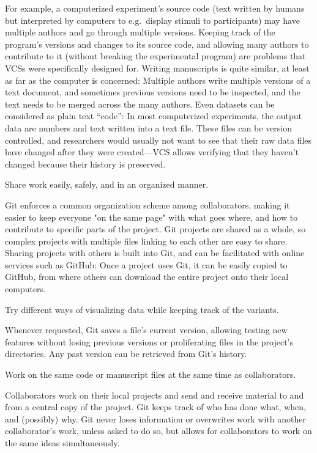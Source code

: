 \documentclass[
  american,
  ,doc,floatsintext]{apa6}
\begin{document}
For example, a computerized experiment's source code (text written by humans but interpreted by computers to e.g.~display stimuli to participants) may have multiple authors and go through multiple versions. Keeping track of the program's versions and changes to its source code, and allowing many authors to contribute to it (without breaking the experimental program) are problems that VCSs were specifically designed for. Writing manuscripts is quite similar, at least as far as the computer is concerned: Multiple authors write multiple versions of a text document, and sometimes previous versions need to be inspected, and the text needs to be merged across the many authors. Even datasets can be considered as plain text \enquote{code}: In most computerized experiments, the output data are numbers and text written into a text file. These files can be version controlled, and researchers would usually not want to see that their raw data files have changed after they were created---VCS allows verifying that they haven't changed because their history is preserved.

\begin{tcolorbox}[colframe=green!50!black, colback=green!5, fonttitle=\small\bfseries, fontupper=\small, title=Box 1. How Git facilitates the scientific workflow.]
Share work easily, safely, and in an organized manner.
    \begin{compactitem}
    \item Git enforces a common organization scheme among collaborators, making it easier to keep everyone "on the same page" with what goes where, and how to contribute to specific parts of the project. Git projects are shared as a whole, so complex projects with multiple files linking to each other are easy to share. Sharing projects with others is built into Git, and can be facilitated with online services such as GitHub: Once a project uses Git, it can be easily copied to GitHub, from where others can download the entire project onto their local computers.
    \end{compactitem}
\vspace{.5em}
Try different ways of visualizing data while keeping track of the variants.
    \begin{compactitem}
    \item Whenever requested, Git saves a file's current version, allowing testing new features without losing previous versions or proliferating files in the project's directories. Any past version can be retrieved from Git's history. 
    \end{compactitem}
\vspace{.5em}
Work on the same code or manuscript files at the same time as collaborators.
    \begin{compactitem}
    \item Collaborators work on their local projects and send and receive material to and from a central copy of the project. Git keeps track of who has done what, when, and (possibly) why. Git never loses information or overwrites work with another collaborator's work, unless asked to do so, but allows for collaborators to work on the same ideas simultaneously. 
    \end{compactitem}
\end{tcolorbox}
\end{document}
